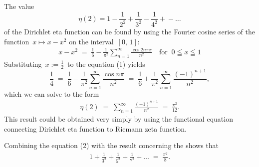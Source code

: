 \documentclass[12pt]{article}
\theoremstyle{definition}
\begin{document}
The value 
$$\eta(2) = 1-\frac{1}{2^2}+\frac{1}{3^2}-\frac{1}{4^2}+\!-\ldots$$
of the Dirichlet eta function can be found by using the Fourier cosine series  of the function \,$x \mapsto x\!-\!x^2$
on the interval \,$[0,\,1]$:
\begin{align}
x\!-\!x^2 \;=\; \frac{1}{6}-\frac{1}{\pi^2}\sum_{n=1}^\infty\frac{\cos{2n\pi x}}{n^2} 
\quad \mbox{for}\;\; 0 \leqq x \leqq 1
\end{align}
Substituting\, $x := \frac{1}{2}$\, to the equation (1) yields
$$\frac{1}{4} \;=\; \frac{1}{6}-\frac{1}{\pi^2}\sum_{n=1}^\infty\frac{\cos{n\pi}}{n^2}
\;=\; \frac{1}{6}+\frac{1}{\pi^2}\sum_{n=1}^\infty\frac{(-1)^{n+1}}{n^2},$$
which we can solve to the form
\begin{align}
\eta(2) \;=\; \sum_{n=1}^\infty\frac{(-1)^{n+1}}{n^2} \;=\; \frac{\pi^2}{12}.
\end{align}
This result could be obtained very simply by using the functional equation connecting Dirichlet eta function to Riemann zeta function.

Combining the equation (2) with the result concerning the  shows that
\begin{align}
1+\frac{1}{3^2}+\frac{1}{5^2}+\frac{1}{7^2}+\ldots \;=\; \frac{\pi^2}{8}.
\end{align}


\end{document}
